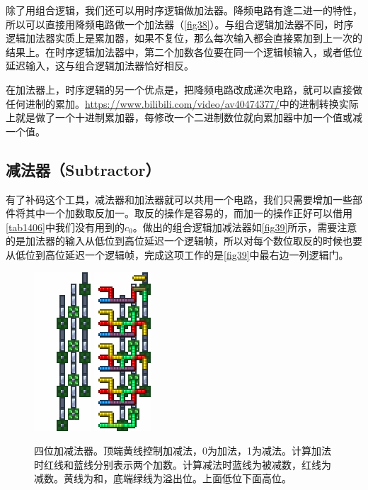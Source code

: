 除了用组合逻辑，我们还可以用时序逻辑做加法器。降频电路有逢二进一的特性，所以可以直接用降频电路做一个加法器（\autoref{fig38}）。与组合逻辑加法器不同，时序逻辑加法器实质上是累加器，如果不复位，那么每次输入都会直接累加到上一次的结果上。在时序逻辑加法器中，第二个加数各位要在同一个逻辑帧输入，或者低位延迟输入，这与组合逻辑加法器恰好相反。

在加法器上，时序逻辑的另一个优点是，把降频电路改成递次电路，就可以直接做任何进制的累加。\url{https://www.bilibili.com/video/av40474377/}中的进制转换实际上就是做了一个十进制累加器，每修改一个二进制数位就向累加器中加一个值或减一个值。

\subsection{减法器（Subtractor）}
有了补码这个工具，减法器和加法器就可以共用一个电路，我们只需要增加一些部件将其中一个加数取反加一。取反的操作是容易的，而加一的操作正好可以借用\autoref{tab1406}中我们没有用到的$c_0$。做出的组合逻辑加减法器如\autoref{fig39}所示，需要注意的是加法器的输入从低位到高位延迟一个逻辑帧，所以对每个数位取反的时候也要从低位到高位延迟一个逻辑帧，完成这项工作的是\autoref{fig39}中最右边一列逻辑门。

\begin{figure}[!ht]
\centering
\includegraphics{images/412.png}
\qquad
\includegraphics{images/413.png}
\caption{四位加减法器。顶端黄线控制加减法，0为加法，1为减法。计算加法时红线和蓝线分别表示两个加数。计算减法时蓝线为被减数，红线为减数。黄线为和，底端绿线为溢出位。上面低位下面高位。}\label{fig39}
\end{figure}

